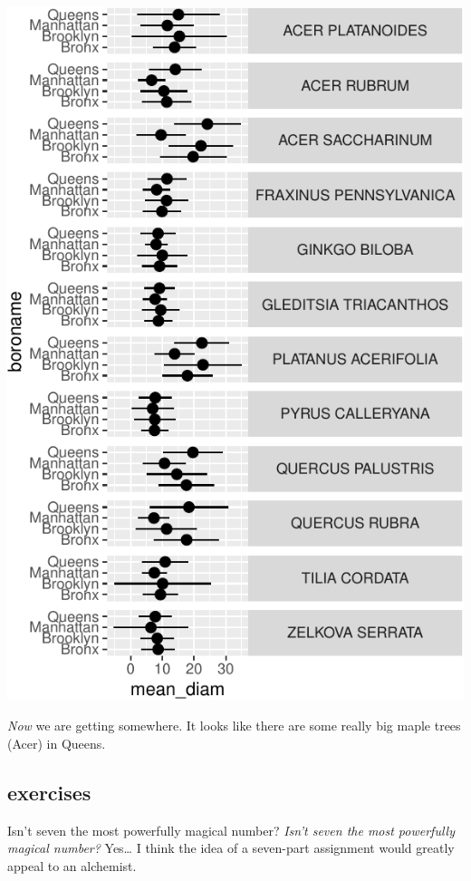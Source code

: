 \documentclass[
]{krantz}
\begin{document}
\begin{center}\includegraphics{index_files/figure-latex/unnamed-chunk-79-1} \end{center}

\emph{Now} we are getting somewhere. It looks like there are some really big maple trees (Acer) in Queens.

\hypertarget{exercises-2}{%
\subsection{exercises}\label{exercises-2}}

Isn't seven the most powerfully magical number? \emph{Isn't seven the most powerfully magical number?} Yes\ldots{} I think the idea of a seven-part assignment would greatly appeal to an alchemist.
\end{document}
